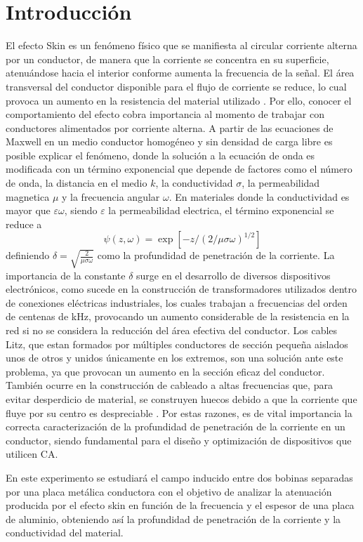 \section{Introducción} %
El efecto Skin es un fenómeno físico que se manifiesta al circular corriente alterna por un conductor, de manera que la corriente se concentra en su superficie, atenuándose hacia el interior conforme aumenta la frecuencia de la señal. El área transversal del conductor disponible para el flujo de corriente se reduce, lo cual provoca un aumento en la resistencia del material utilizado \cite{ietLabsSkinEffect}. Por ello, conocer el comportamiento del efecto cobra importancia al momento de trabajar con conductores alimentados por corriente alterna. A partir de las ecuaciones de Maxwell en un medio conductor homogéneo y sin densidad de carga libre es posible explicar el fenómeno, donde la solución a la ecuación de onda es modificada con un término exponencial que depende de factores como el número de onda, la distancia en el medio $k$, la  conductividad $\sigma$, la permeabilidad magnetica $\mu$ y la frecuencia angular $\omega$. En materiales donde la conductividad es mayor que $\varepsilon \omega$, siendo $\varepsilon$ la permeabilidad electrica, el término exponencial se reduce a \cite{ecuacionesSkinEffect} 
\begin{equation}
    \psi(z, \omega) = \exp\left[ -z/(2/\mu \sigma \omega)^{1/2} \right]
    \label{eq: psi(z)}
\end{equation}
definiendo $\delta = \sqrt{\frac{2}{\mu \sigma \omega}}$ como la profundidad de penetración de la corriente. La importancia de la constante $\delta$ surge en el desarrollo de diversos dispositivos electrónicos, como sucede en la construcción de transformadores utilizados dentro de conexiones eléctricas industriales, los cuales trabajan a frecuencias del orden de centenas de \si{\kilo\hertz}, provocando un aumento considerable de la resistencia en la red si no se considera la reducción del área efectiva del conductor. Los cables Litz, que estan formados por múltiples conductores de sección pequeña aislados unos de otros y unidos únicamente en los extremos, son una solución ante este problema, ya que provocan un aumento en la sección eficaz del conductor. También ocurre en la construcción de cableado a altas frecuencias que, para evitar desperdicio de material, se construyen huecos debido a que la corriente que fluye por su centro es despreciable \cite{arrillagaArmonicos}. Por estas razones, es de vital importancia la correcta caracterización de la profundidad de penetración de la corriente en un conductor, siendo fundamental para el diseño y optimización de dispositivos que utilicen CA. 

En este experimento se estudiará el campo inducido entre dos bobinas separadas por una placa metálica conductora con el objetivo de analizar la atenuación producida por el efecto skin en función de la frecuencia y el espesor de una placa de aluminio, obteniendo así la profundidad de penetración de la corriente y la conductividad del material.